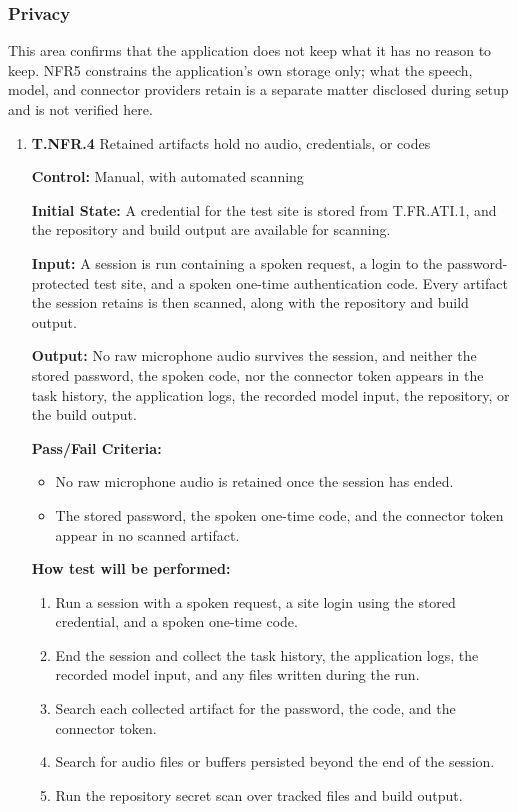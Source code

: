 \documentclass[12pt, titlepage]{article}
\begin{document}
\subsubsection{Privacy}

This area confirms that the application does not keep what it has no reason to keep. NFR5 constrains the
application's own storage only; what the speech, model, and connector providers retain is a separate matter
disclosed during setup and is not verified here.

\begin{enumerate}


\item{\textbf{T.NFR.4} Retained artifacts hold no audio, credentials, or codes\\}\label{test:T.NFR.4}

\textbf{Control:} Manual, with automated scanning

\textbf{Initial State:} A credential for the test site is stored from T.FR.ATI.1, and the repository and build
output are available for scanning.

\textbf{Input:} A session is run containing a spoken request, a login to the password-protected test
site, and a spoken one-time authentication code. Every artifact the session retains is then scanned, along with
the repository and build output.

\textbf{Output:} No raw microphone audio survives the session, and neither the stored password, the spoken
code, nor the connector token appears in the task history, the application logs, the recorded model input, the
repository, or the build output.

\textbf{Pass/Fail Criteria:}
\begin{itemize}
  \item No raw microphone audio is retained once the session has ended.
  \item The stored password, the spoken one-time code, and the connector token appear in no scanned artifact.
\end{itemize}

\textbf{How test will be performed:}

\begin{enumerate}
  \item Run a session with a spoken request, a site login using the stored credential, and a spoken one-time code.
  \item End the session and collect the task history, the application logs, the recorded model input, and any files written during the run.
  \item Search each collected artifact for the password, the code, and the connector token.
  \item Search for audio files or buffers persisted beyond the end of the session.
  \item Run the repository secret scan over tracked files and build output.
\end{enumerate}


\end{enumerate}
\end{document}
